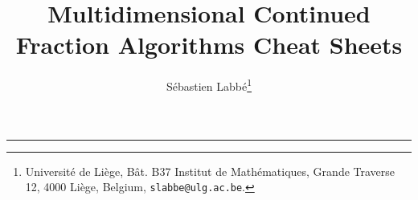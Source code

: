 \documentclass[10pt,landscape,a4paper]{article}
\begin{document}
\title{Multidimensional Continued Fraction Algorithms Cheat Sheets}
\author{Sébastien Labbé\footnote{
Université de Liège,
B\^at. B37 Institut de Math\'ematiques,
Grande Traverse 12,
4000 Li\`ege,
Belgium,
\texttt{slabbe@ulg.ac.be}.}}
\date{}

\maketitle



\thispagestyle{empty} %


\begin{multicols}{2}

\columnbreak
\tableofcontents
\end{multicols}

\raggedright

\newpage

\begin{multicols}{3}
\setlength{\premulticols}{1pt}
\setlength{\postmulticols}{1pt}
\setlength{\multicolsep}{1pt}
\setlength{\columnsep}{2pt}
\newcommand{\note}[1]{\hfill\textrm{\textcolor{gray}{#1}}}
\newcommand{\args}[1]{\textit{\textcolor{blue}{#1}}}
\newcommand{\stdout}[1]{\textcolor{Sepia}{#1}}
\footnotesize


\end{multicols}

\footnotesize


\begin{multicols}{3}
\setlength{\premulticols}{1pt}
\setlength{\postmulticols}{1pt}
\setlength{\multicolsep}{1pt}
\setlength{\columnsep}{2pt}
\newcommand{\note}[1]{\hfill\textrm{\textcolor{gray}{#1}}}
\newcommand{\args}[1]{\textit{\textcolor{blue}{#1}}}
\newcommand{\stdout}[1]{\textcolor{Sepia}{#1}}
\raggedright
\footnotesize




\rule{0.3\linewidth}{0.25pt}
\scriptsize



\end{multicols}
\end{document}
